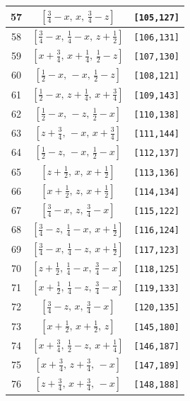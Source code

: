 \documentclass[fleqn,8pt]{jsarticle}
\begin{document}
\begin{longtable}{ccc}
57 & $\left[ \frac{3}{4} - x,\, x,\, \frac{3}{4} - z \right]$ & {\tt [105,127]} \\ \hline
58 & $\left[ \frac{3}{4} - x,\, \frac{1}{4} - x,\, z + \frac{1}{2} \right]$ & {\tt [106,131]} \\ \hline
59 & $\left[ x + \frac{3}{4},\, x + \frac{1}{4},\, \frac{1}{2} - z \right]$ & {\tt [107,130]} \\ \hline
60 & $\left[ \frac{1}{2} - x,\, - x,\, \frac{1}{2} - z \right]$ & {\tt [108,121]} \\ \hline
61 & $\left[ \frac{1}{2} - x,\, z + \frac{1}{4},\, x + \frac{3}{4} \right]$ & {\tt [109,143]} \\ \hline
62 & $\left[ \frac{1}{2} - x,\, - z,\, \frac{1}{2} - x \right]$ & {\tt [110,138]} \\ \hline
63 & $\left[ z + \frac{3}{4},\, - x,\, x + \frac{3}{4} \right]$ & {\tt [111,144]} \\ \hline
64 & $\left[ \frac{1}{2} - z,\, - x,\, \frac{1}{2} - x \right]$ & {\tt [112,137]} \\ \hline
65 & $\left[ z + \frac{1}{2},\, x,\, x + \frac{1}{2} \right]$ & {\tt [113,136]} \\ \hline
66 & $\left[ x + \frac{1}{2},\, z,\, x + \frac{1}{2} \right]$ & {\tt [114,134]} \\ \hline
67 & $\left[ \frac{3}{4} - x,\, z,\, \frac{3}{4} - x \right]$ & {\tt [115,122]} \\ \hline
68 & $\left[ \frac{3}{4} - z,\, \frac{1}{4} - x,\, x + \frac{1}{2} \right]$ & {\tt [116,124]} \\ \hline
69 & $\left[ \frac{3}{4} - x,\, \frac{1}{4} - z,\, x + \frac{1}{2} \right]$ & {\tt [117,123]} \\ \hline
70 & $\left[ z + \frac{1}{2},\, \frac{1}{4} - x,\, \frac{3}{4} - x \right]$ & {\tt [118,125]} \\ \hline
71 & $\left[ x + \frac{1}{2},\, \frac{1}{4} - z,\, \frac{3}{4} - x \right]$ & {\tt [119,133]} \\ \hline
72 & $\left[ \frac{3}{4} - z,\, x,\, \frac{3}{4} - x \right]$ & {\tt [120,135]} \\ \hline
73 & $\left[ x + \frac{1}{2},\, x + \frac{1}{2},\, z \right]$ & {\tt [145,180]} \\ \hline
74 & $\left[ x + \frac{3}{4},\, \frac{1}{2} - z,\, x + \frac{1}{4} \right]$ & {\tt [146,187]} \\ \hline
75 & $\left[ x + \frac{3}{4},\, z + \frac{3}{4},\, - x \right]$ & {\tt [147,189]} \\ \hline
76 & $\left[ z + \frac{3}{4},\, x + \frac{3}{4},\, - x \right]$ & {\tt [148,188]} \\ \hline

\end{longtable}
\end{document}

